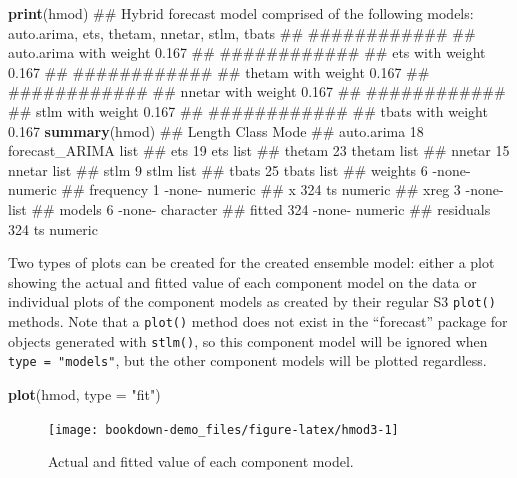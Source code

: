 \documentclass[]{book}
\newenvironment{Shaded}{\begin{snugshade}}{\end{snugshade}}
\newcommand{\KeywordTok}[1]{\textcolor[rgb]{0.13,0.29,0.53}{\textbf{#1}}}
\newcommand{\DataTypeTok}[1]{\textcolor[rgb]{0.13,0.29,0.53}{#1}}
\newcommand{\StringTok}[1]{\textcolor[rgb]{0.31,0.60,0.02}{#1}}
\newcommand{\NormalTok}[1]{#1}
\begin{document}
\begin{Shaded}
\begin{Highlighting}[]
\KeywordTok{print}\NormalTok{(hmod) }
\NormalTok{## Hybrid forecast model comprised of the following models: auto.arima, ets, thetam, nnetar, stlm, tbats}
\NormalTok{## ############}
\NormalTok{## auto.arima with weight 0.167 }
\NormalTok{## ############}
\NormalTok{## ets with weight 0.167 }
\NormalTok{## ############}
\NormalTok{## thetam with weight 0.167 }
\NormalTok{## ############}
\NormalTok{## nnetar with weight 0.167 }
\NormalTok{## ############}
\NormalTok{## stlm with weight 0.167 }
\NormalTok{## ############}
\NormalTok{## tbats with weight 0.167}
\KeywordTok{summary}\NormalTok{(hmod)}
\NormalTok{##            Length Class          Mode     }
\NormalTok{## auto.arima  18    forecast_ARIMA list     }
\NormalTok{## ets         19    ets            list     }
\NormalTok{## thetam      23    thetam         list     }
\NormalTok{## nnetar      15    nnetar         list     }
\NormalTok{## stlm         9    stlm           list     }
\NormalTok{## tbats       25    tbats          list     }
\NormalTok{## weights      6    -none-         numeric  }
\NormalTok{## frequency    1    -none-         numeric  }
\NormalTok{## x          324    ts             numeric  }
\NormalTok{## xreg         3    -none-         list     }
\NormalTok{## models       6    -none-         character}
\NormalTok{## fitted     324    -none-         numeric  }
\NormalTok{## residuals  324    ts             numeric}
\end{Highlighting}
\end{Shaded}

Two types of plots can be created for the created ensemble model: either
a plot showing the actual and fitted value of each component model on
the data or individual plots of the component models as created by their
regular S3 \texttt{plot()} methods. Note that a \texttt{plot()} method
does not exist in the ``forecast'' package for objects generated with
\texttt{stlm()}, so this component model will be ignored when
\texttt{type\ =\ "models"}, but the other component models will be
plotted regardless.

\begin{Shaded}
\begin{Highlighting}[]
\KeywordTok{plot}\NormalTok{(hmod, }\DataTypeTok{type =} \StringTok{"fit"}\NormalTok{)}
\end{Highlighting}
\end{Shaded}

\begin{figure}

{\centering \texttt{[image: bookdown-demo\_files/figure-latex/hmod3-1]} 

}

\caption{Actual and fitted value of each component model.}\label{fig:hmod3}
\end{figure}
\end{document}
